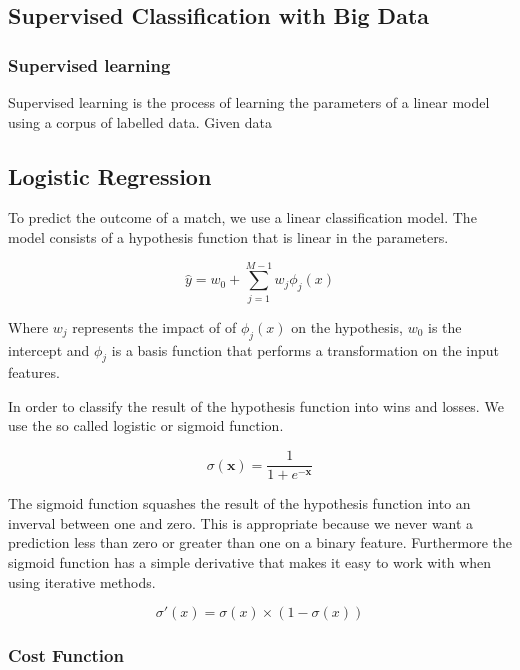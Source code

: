 \subsection{Supervised Classification with Big Data}

\subsubsection{Supervised learning}
Supervised learning is the process of learning the parameters of a linear model using a corpus of labelled data.
Given data



\subsection{Logistic Regression}\label{sec:logistic}

To predict the outcome of a match, we use a linear classification model.
The model consists of a hypothesis function that is linear in the parameters.

\[ \hat{y} = w_0 + \sum_{j=1}^{M-1} w_j \phi_j(x) \]

Where $w_j$ represents the impact of of $\phi_j(x)$ on the hypothesis,
$w_0$ is the intercept and $\phi_j$ is a basis function that
performs a transformation on the input features. 


In order to classify the result of the hypothesis function into wins and losses. 
We use the so called logistic or sigmoid function.

\[ \sigma(\textbf{x}) = \frac{1}{1+e^{- \textbf{x}}} \]

The sigmoid function squashes the result of the hypothesis function into an inverval between one and zero.
This is appropriate because we never want a prediction less than zero or greater than one on a binary feature.
Furthermore the sigmoid function has a simple derivative that makes it easy to work with when using iterative methods.

\[ \sigma'(x) = \sigma(x) \times (1-\sigma(x)) \] 

\subsubsection{Cost Function}

